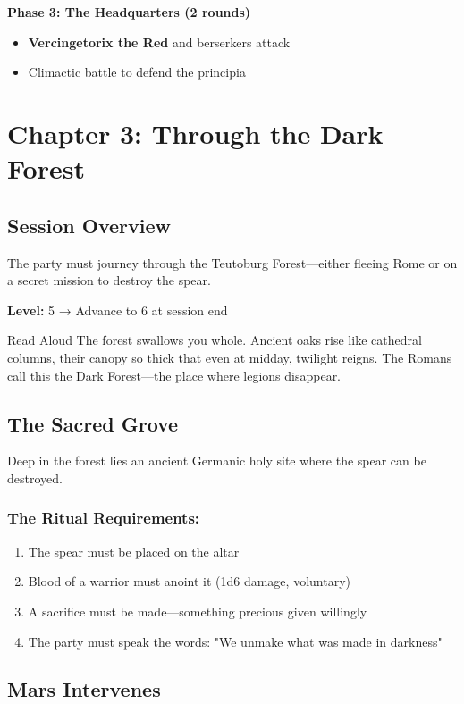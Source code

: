 \documentclass[letterpaper,oneside,twocolumn,openany]{dndbook}
\begin{document}
\textbf{Phase 3: The Headquarters (2 rounds)}
\begin{itemize}
\item \textbf{Vercingetorix the Red} and berserkers attack
\item Climactic battle to defend the principia
\end{itemize}

\chapter{Chapter 3: Through the Dark Forest}

\section{Session Overview}
The party must journey through the Teutoburg Forest—either fleeing Rome or on a secret mission to destroy the spear.

\textbf{Level:} 5 → Advance to 6 at session end

\begin{paperbox}{Read Aloud}
The forest swallows you whole. Ancient oaks rise like cathedral columns, their canopy so thick that even at midday, twilight reigns. The Romans call this the Dark Forest—the place where legions disappear.
\end{paperbox}

\section{The Sacred Grove}

Deep in the forest lies an ancient Germanic holy site where the spear can be destroyed.

\subsection{The Ritual Requirements:}
\begin{enumerate}
\item The spear must be placed on the altar
\item Blood of a warrior must anoint it (1d6 damage, voluntary)
\item A sacrifice must be made—something precious given willingly
\item The party must speak the words: "We unmake what was made in darkness"
\end{enumerate}

\section{Mars Intervenes}
\end{document}

